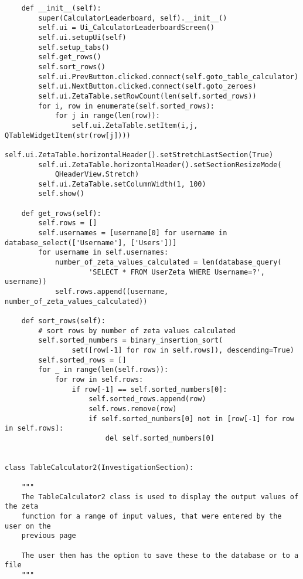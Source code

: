 \documentclass{article}
\begin{document}
\begin{lstlisting}
    def __init__(self):
        super(CalculatorLeaderboard, self).__init__()
        self.ui = Ui_CalculatorLeaderboardScreen()
        self.ui.setupUi(self)
        self.setup_tabs()
        self.get_rows()
        self.sort_rows()
        self.ui.PrevButton.clicked.connect(self.goto_table_calculator)
        self.ui.NextButton.clicked.connect(self.goto_zeroes)
        self.ui.ZetaTable.setRowCount(len(self.sorted_rows))
        for i, row in enumerate(self.sorted_rows):
            for j in range(len(row)):
                self.ui.ZetaTable.setItem(i,j, QTableWidgetItem(str(row[j])))
        self.ui.ZetaTable.horizontalHeader().setStretchLastSection(True)
        self.ui.ZetaTable.horizontalHeader().setSectionResizeMode(
            QHeaderView.Stretch)
        self.ui.ZetaTable.setColumnWidth(1, 100)
        self.show()

    def get_rows(self):
        self.rows = []
        self.usernames = [username[0] for username in database_select(['Username'], ['Users'])]
        for username in self.usernames:
            number_of_zeta_values_calculated = len(database_query(
                    'SELECT * FROM UserZeta WHERE Username=?', username))
            self.rows.append((username, number_of_zeta_values_calculated))

    def sort_rows(self):
        # sort rows by number of zeta values calculated
        self.sorted_numbers = binary_insertion_sort(
                set([row[-1] for row in self.rows]), descending=True)
        self.sorted_rows = []
        for _ in range(len(self.rows)):
            for row in self.rows:
                if row[-1] == self.sorted_numbers[0]:
                    self.sorted_rows.append(row)
                    self.rows.remove(row)
                    if self.sorted_numbers[0] not in [row[-1] for row in self.rows]:
                        del self.sorted_numbers[0]


class TableCalculator2(InvestigationSection):

    """
    The TableCalculator2 class is used to display the output values of the zeta
    function for a range of input values, that were entered by the user on the
    previous page

    The user then has the option to save these to the database or to a file
    """


\end{lstlisting}
\end{document}
